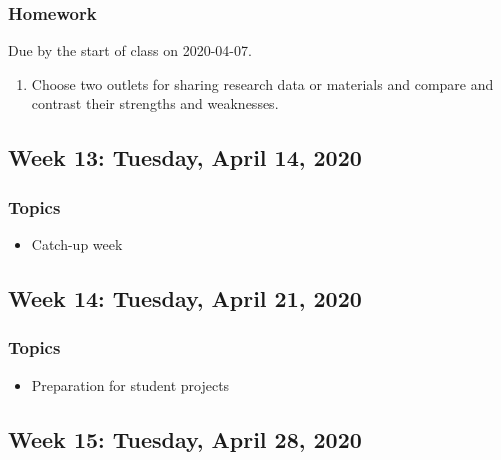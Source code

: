 \documentclass[
]{article}
\providecommand{\tightlist}{%
  \setlength{\itemsep}{0pt}\setlength{\parskip}{0pt}}
\begin{document}
\hypertarget{homework-11}{%
\subsubsection{Homework}\label{homework-11}}

Due by the start of class on 2020-04-07.

\begin{enumerate}
\def\labelenumi{\arabic{enumi}.}
\tightlist
\item
  Choose two outlets for sharing research data or materials and compare
  and contrast their strengths and weaknesses.
\end{enumerate}

\hypertarget{week-13-tuesday-april-14-2020}{%
\subsection{Week 13: Tuesday, April 14,
2020}\label{week-13-tuesday-april-14-2020}}

\hypertarget{topics-12}{%
\subsubsection{Topics}\label{topics-12}}

\begin{itemize}
\tightlist
\item
  Catch-up week
\end{itemize}

\hypertarget{week-14-tuesday-april-21-2020}{%
\subsection{Week 14: Tuesday, April 21,
2020}\label{week-14-tuesday-april-21-2020}}

\hypertarget{topics-13}{%
\subsubsection{Topics}\label{topics-13}}

\begin{itemize}
\tightlist
\item
  Preparation for student projects
\end{itemize}

\hypertarget{week-15-tuesday-april-28-2020}{%
\subsection{Week 15: Tuesday, April 28,
2020}\label{week-15-tuesday-april-28-2020}}
\end{document}
